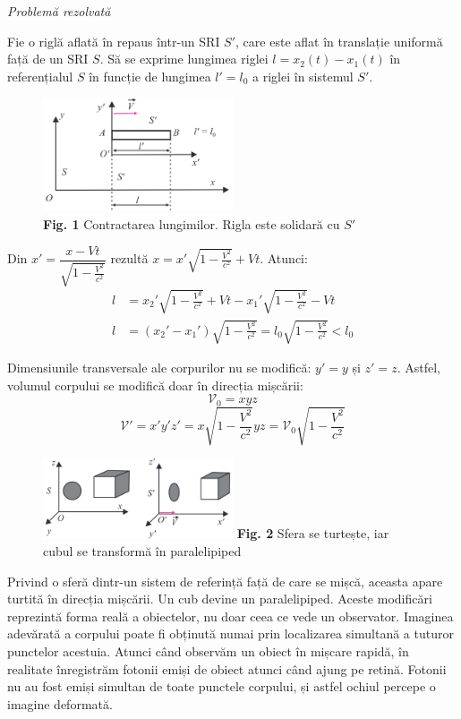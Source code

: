 \documentclass[a4paper, 12pt]{article}
\newcommand{\parbreak}{\vspace{1cm}}
\newcommand{\figcaption}[2]{\scriptsize{\textbf{Fig. #1} #2}}
\newcommand{\lorentzradical}{\sqrt{1 - \frac{V^2}{c^2}}}
\begin{document}
{\Large\emph{Problemă rezolvată}}
\vspace{0.5cm}

Fie o riglă aflată în repaus într-un SRI $S'$, care este aflat în translație
uniformă față de un SRI $S$. Să se exprime lungimea riglei \( l = x_2(t) - x_1(t) \)
în referențialul $S$ în funcție de lungimea \( l' = l_0 \)
a riglei în sistemul $S'$.

\begin{figure}[h]
    \centering
    \includegraphics[width=0.5\textwidth]{fig/rigla} \\
    \figcaption{1}{Contractarea lungimilor. Rigla este solidară cu $S'$}
\end{figure}

Din \( x' = \dfrac{x - Vt}{\lorentzradical} \)
rezultă \( x = x' \lorentzradical + Vt \). Atunci:
\begin{align*}
    l &= x_2' \lorentzradical + Vt - x_1' \lorentzradical - Vt \\
    l &= (x_2' - x_1') \lorentzradical = l_0 \lorentzradical < l_0
\end{align*}

\parbreak

Dimensiunile transversale ale corpurilor nu se modifică: \( y' = y \) și \( z' = z \).
Astfel, volumul corpului se modifică doar în direcția mișcării:
\[ \mathscr{V}_0 = xyz \]
\[ \mathscr{V}' = x'y'z' = x\lorentzradical yz = \mathscr{V}_0 \lorentzradical \]

\begin{figure}
    \centering
    \includegraphics[width=0.5\textwidth]{fig/turtit.png}
    \figcaption{2}{Sfera se turtește, iar cubul se transformă în paralelipiped}
\end{figure}

Privind o sferă dintr-un sistem de referință față de care se mișcă, aceasta
apare turtită în direcția mișcării. Un cub devine un paralelipiped.
Aceste modificări reprezintă forma reală a obiectelor, nu doar ceea ce vede
un observator. Imaginea adevărată a corpului poate fi obținută numai prin
localizarea simultană a tuturor punctelor acestuia. Atunci când observăm un
obiect în mișcare rapidă, în realitate înregistrăm fotonii emiși de obiect
atunci când ajung pe retină. Fotonii nu au fost emiși simultan de toate punctele
corpului, și astfel ochiul percepe o imagine deformată.
\end{document}
